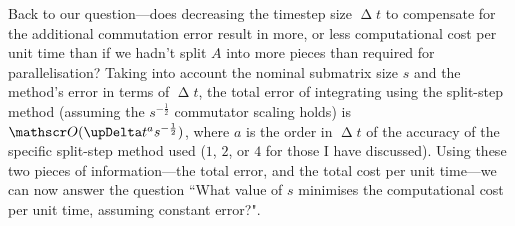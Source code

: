 Back to our question---does decreasing the timestep size $\upDelta t$ to compensate for the additional commutation error result in more, or less computational cost per unit time than if we hadn't split $A$ into more pieces than required for parallelisation? Taking into account the nominal submatrix size $s$ and the method's error in terms of $\upDelta t$, the total error of integrating using the split-step method (assuming the $s^{-\frac12}$ commutator scaling holds) is $\Ord{\upDelta t^a s^{-\frac12}}$, where $a$ is the order in $\upDelta t$ of the accuracy of the specific split-step method used ($1$, $2$, or $4$ for those I have discussed). Using these two pieces of information---the total error, and the total cost per unit time---we can now answer the question ``What value of $s$ minimises the computational cost per unit time, assuming constant error?".

